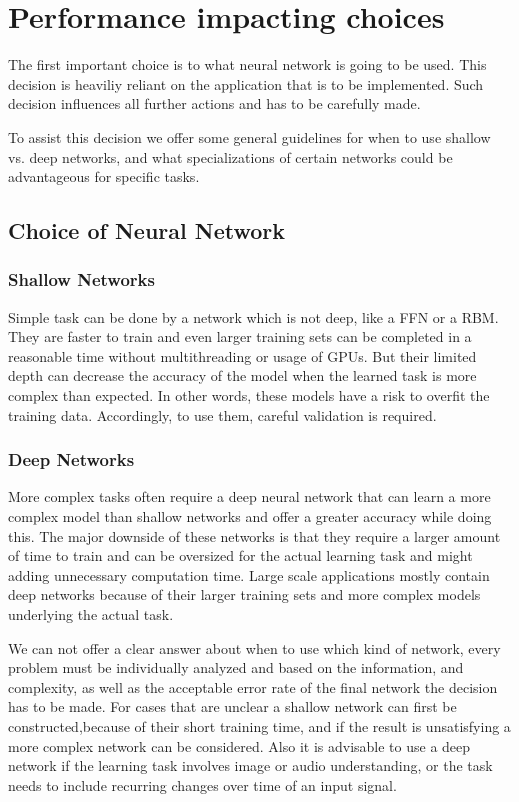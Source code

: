 \documentclass[conference]{IEEEtran}
\begin{document}

\section{Performance impacting choices}	

The first important choice is to what neural network is going to be used. This decision is heaviliy reliant on the application that is to be implemented. Such decision influences all further actions and has to be carefully made.

To assist this decision we offer some general guidelines for when to use shallow vs. deep networks, and what specializations of certain networks could be advantageous for specific tasks.

\subsection{Choice of Neural Network}
\subsubsection{Shallow Networks}
Simple task can be done by a network which is not deep, like a FFN or a RBM. They are faster to train and even larger training sets can be completed in a reasonable time without multithreading or usage of GPUs. But their limited depth can decrease the accuracy of the model when the learned task is more complex than expected. In other words, these models have a risk to overfit the training data. Accordingly, to use them, careful validation is required. 

\subsubsection{Deep Networks}
More complex tasks often require a deep neural network that can learn a more complex model than shallow networks and offer a greater accuracy while doing this. The major downside of these networks is that they require a larger amount of time to train and can be oversized for the actual learning task and might adding unnecessary computation time. Large scale applications mostly contain deep networks because of their larger training sets and more complex models underlying the actual task.

We can not offer a clear answer about when to use which kind of network, every problem must be individually analyzed and based on the information, and complexity, as well as the acceptable error rate of the final network the decision has to be made. For cases that are unclear a shallow network can first be constructed,because of their short training time, and if the result is unsatisfying a more complex network can be considered.  Also it is advisable to use a deep network if the learning task involves image or audio understanding, or the task needs to include recurring changes over time of an input signal\cite{PattersonGibson17}.
\end{document}
